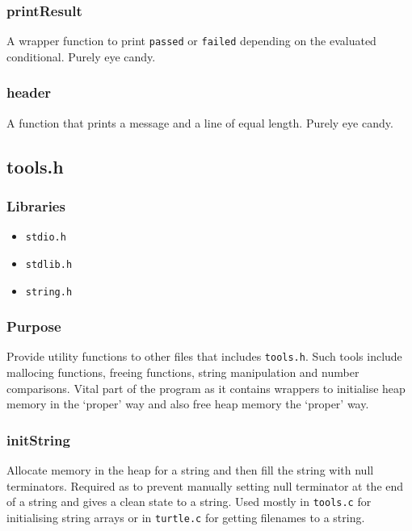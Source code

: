 \documentclass[a4paper, 12pt, titlepage]{article}
\newcommand{\code}[1]{\small\texttt{#1}\normalsize}
\begin{document}
\subsubsection{printResult}

A wrapper function to print \code{passed} or \code{failed} depending on the
evaluated conditional. Purely eye candy.

\subsubsection{header}

A function that prints a message and a line of equal length. Purely eye candy.

\pagebreak
\subsection{tools.h}
\subsubsection{Libraries}

\begin{itemize}[label={--}, noitemsep]
    \item \code{stdio.h}
    \item \code{stdlib.h}
    \item \code{string.h}
\end{itemize}

\subsubsection{Purpose}

Provide utility functions to other files that includes \code{tools.h}. Such
tools include mallocing functions, freeing functions, string manipulation
and number comparisons. Vital part of the program as it contains wrappers to
initialise heap memory in the `proper' way and also free heap memory the
`proper' way.

\subsubsection{initString}

Allocate memory in the heap for a string and then fill the string with null
terminators. Required as to prevent manually setting null terminator at the
end of a string and gives a clean state to a string. Used mostly in
\code{tools.c} for initialising string arrays or in \code{turtle.c} for
getting filenames to a string.
\end{document}
